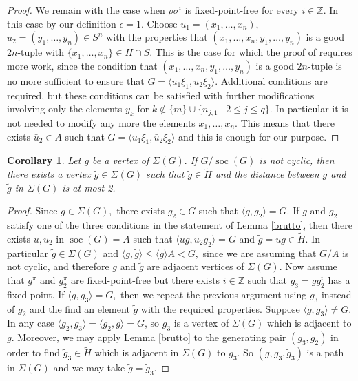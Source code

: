 \documentclass{amsart}
\DeclareMathOperator{\soc}{soc}
\newtheorem{cor}[thm]{Corollary}
\numberwithin{equation}{section}
\begin{document}
\begin{proof}
We remain with the case when $\rho\sigma^i$ is fixed-point-free for every $i \in \mathbb Z.$ In this case
by our definition $\epsilon=1.$ Choose
$u_1=(x_1,\dots,x_n)$, $u_2=(y_1,\dots,y_n) \in S^n$ with the properties that $(x_1,\dots,x_n,y_1,\dots,y_n)$ is a good $2n$-tuple with $\{x_1,\dots,x_n\}\in H\cap S.$ This is the case for which the proof of \cite[Theorem 1.1]{uni} requires more work, since the condition that $(x_1,\dots,x_n,y_1,\dots,y_n)$ is a good $2n$-tuple is no more sufficient to ensure that $G=\langle u_1\bar \xi_1,
u_2\bar \xi_2\rangle.$ Additional conditions are required, but these conditions can be satisfied with further modifications involving only the elements $y_k$ for $k \notin \{m\} \cup\{n_{j,1}\mid 2 \leq j \leq q\}$. In particular it is not needed to modify any more the elements $x_1,\dots,x_n$. This means that there exists $\bar u_2 \in A$ such that
$G=\langle u_1\bar \xi_1,
\bar u_2\bar \xi_2\rangle$	and this is enough for our purpose.
\end{proof}

\begin{cor}\label{tildeg}
	Let $g$ be a vertex of $\Sigma(G).$ If $G/\soc(G)$ is not cyclic, then there exists a vertex $\tilde g \in \Sigma(G)$ such that $\tilde g \in \tilde H$ and the distance between $g$ and $\tilde g$ in $\Sigma(G)$ is at most 2. 
\end{cor}
\begin{proof}
Since $g \in \Sigma(G),$ there exists $g_2 \in G$ such that $\langle g, g_2\rangle =G.$ %
If $g$ and $g_2$ satisfy one of the three conditions in the statement of Lemma \ref{brutto}, then there exists $u, u_2$ in $\soc(G)=A$ such that
$\langle ug, u_2g_2 \rangle =G$ and $\tilde g= ug \in \tilde H.$
In particular $\tilde g \in \Sigma(G)$ and $\langle g, \tilde g \rangle \leq \langle g \rangle A < G,$ since we are assuming that $G/A$ is not cyclic, and therefore $g$ and $\tilde g$ are adjacent vertices of $\Sigma(G).$ 
Now assume that $g^\pi$ and $g_2^\pi$ are fixed-point-free but there exists $i\in \mathbb Z$ such that $g_3=gg_2^i$ has a fixed point. If $\langle g, g_3 \rangle=G,$ then we repeat the previous argument using $g_3$ instead of $g_2$ and the find an element $\tilde g$ with the required properties. Suppose $\langle g,g_3 \rangle \neq G.$ In any case $\langle g_2, g_3\rangle= \langle g_2, g\rangle=G$, so $g_3$ is a vertex of $\Sigma(G)$ which is adjacent to $g.$ Moreover, we may apply Lemma \ref{brutto} to the generating pair $(g_3,g_2)$ in order to find $\tilde g_3 \in 
\tilde H$ which is adjacent in $\Sigma(G)$ to $g_3$. So $(g, g_3,  \tilde g_3)$ is a path in $\Sigma(G)$
and  we may take $\tilde g=\tilde g_3.$
\end{proof}
\end{document}
